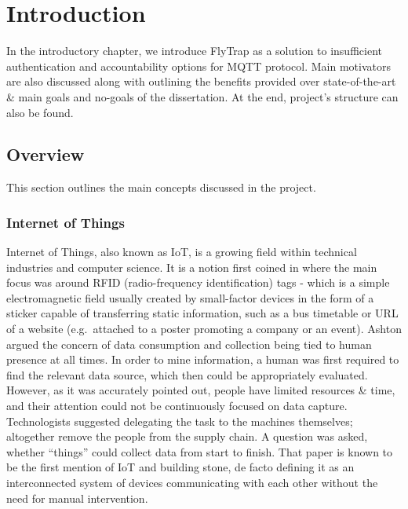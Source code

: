 \chapter{Introduction\label{chap:introduction}}
In the introductory chapter, we introduce FlyTrap as a solution to insufficient authentication and accountability options for MQTT protocol. Main motivators are also discussed along with outlining the benefits provided over state-of-the-art \& main goals and no-goals of the dissertation. At the end, project's structure can also be found.
\section{Overview}
This section outlines the main concepts discussed in the project. 
\subsection{Internet of Things}
Internet of Things, also known as IoT, is a growing field within technical industries and computer science. It is a notion first coined in \citet{ashton1999introduction} where the main focus was around RFID (radio-frequency identification) tags - which is a simple electromagnetic field usually created by small-factor devices in the form of a sticker capable of transferring static information, such as a bus timetable or URL of a website (e.g.\ attached to a poster promoting a company or an event). Ashton argued the concern of data consumption and collection being tied to human presence at all times. In order to mine information, a human was first required to find the relevant data source, which then could be appropriately evaluated. However, as it was accurately pointed out, people have limited resources \& time, and their attention could not be continuously focused on data capture. Technologists suggested delegating the task to the machines themselves; altogether remove the people from the supply chain. A question was asked, whether ``things'' could collect data from start to finish. That paper is known to be the first mention of IoT and building stone, de facto defining it as an interconnected system of devices communicating with each other without the need for manual intervention.

